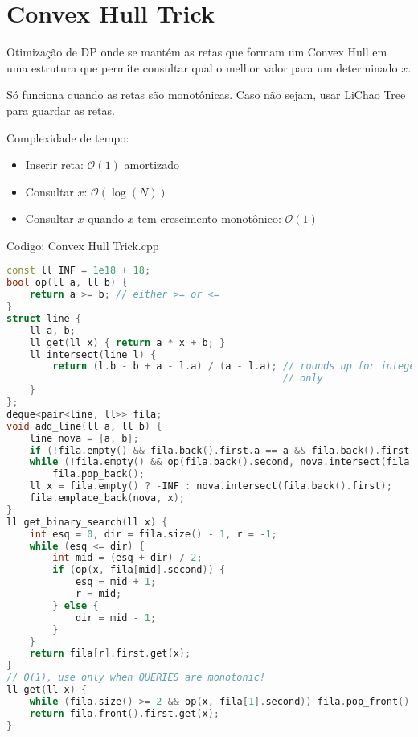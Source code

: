 \documentclass[10pt, a4paper, oneside]{book}
\begin{document}
\section{Convex Hull Trick}


Otimização de DP onde se mantém as retas que formam um Convex Hull em uma estrutura que permite consultar qual o melhor valor para um determinado $x$.



Só funciona quando as retas são monotônicas. Caso não sejam, usar LiChao Tree para guardar as retas.



Complexidade de tempo:



\begin{itemize}
\item Inserir reta: $\mathcal{O}(1)$ amortizado
\item Consultar $x$: $\mathcal{O}(\log(N))$
\item Consultar $x$ quando $x$ tem crescimento monotônico: $\mathcal{O}(1)$
\end{itemize}

\hfill

Codigo: Convex Hull Trick.cpp

\begin{lstlisting}[language=C++]
const ll INF = 1e18 + 18;
bool op(ll a, ll b) {
    return a >= b; // either >= or <=
}
struct line {
    ll a, b;
    ll get(ll x) { return a * x + b; }
    ll intersect(line l) {
        return (l.b - b + a - l.a) / (a - l.a); // rounds up for integer
                                                // only
    }
};
deque<pair<line, ll>> fila;
void add_line(ll a, ll b) {
    line nova = {a, b};
    if (!fila.empty() && fila.back().first.a == a && fila.back().first.b == b) return;
    while (!fila.empty() && op(fila.back().second, nova.intersect(fila.back().first)))
        fila.pop_back();
    ll x = fila.empty() ? -INF : nova.intersect(fila.back().first);
    fila.emplace_back(nova, x);
}
ll get_binary_search(ll x) {
    int esq = 0, dir = fila.size() - 1, r = -1;
    while (esq <= dir) {
        int mid = (esq + dir) / 2;
        if (op(x, fila[mid].second)) {
            esq = mid + 1;
            r = mid;
        } else {
            dir = mid - 1;
        }
    }
    return fila[r].first.get(x);
}
// O(1), use only when QUERIES are monotonic!
ll get(ll x) {
    while (fila.size() >= 2 && op(x, fila[1].second)) fila.pop_front();
    return fila.front().first.get(x);
}
\end{lstlisting}
\hfill
\end{document}
